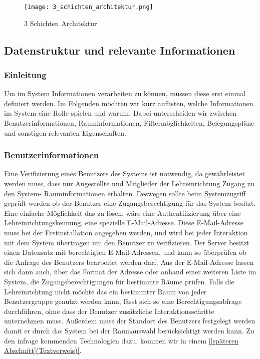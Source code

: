 \begin{figure}
	\centering
	\texttt{[image: 3\_schichten\_architektur.png]}
	\caption{3 Schichten Architektur}
\end{figure}

\subsection{Datenstruktur und relevante Informationen}
\label{sec:Datenstruktur_und_relevante_Informationen}

\subsubsection{Einleitung}
\label{sec:Datenstruktur_und_relevante_Informationen_Einleitung}

Um im System Informationen verarbeiten zu können, müssen diese erst einmal
definiert werden. Im Folgenden möchten wir kurz auflisten, welche Informationen
im System eine Rolle spielen und warum. Dabei unterscheiden wir zwischen
Benutzerinformationen, Rauminformationen, Filtermöglichkeiten, Belegungspläne
und sonstigen relevanten Eigenschaften.

\subsubsection{Benutzerinformationen}
\label{sec:Benutzerinformationen}

Eine Verifizierung eines Benutzers des Systems ist notwendig, da gewährleistet
werden muss, dass nur Angestellte und Mitglieder der Lehreinrichtung Zugang zu
den System- \bzw Rauminformationen erhalten. Deswegen sollte beim Systemzugriff
geprüft werden ob der Benutzer eine Zugangsberechtigung für das System besitzt.
Eine einfache Möglichkeit das zu lösen, wäre eine Authentifizierung über eine
Lehreinrichtungskennung, \zB eine spezielle E-Mail-Adresse.
Diese E-Mail-Adresse muss bei der Erstinstallation angegeben werden, und wird
bei jeder Interaktion mit dem System übertragen um den Benutzer zu
verifizieren. Der Server besitzt einen Datensatz mit berechtigten
E-Mail-Adressen, und kann so überprüfen ob die Anfrage des Benutzers bearbeitet
werden darf. Aus der E-Mail-Adresse lassen sich dann auch, \zB über das Format
der Adresse oder anhand einer weiteren Liste im System, die
Zugangsberechtigungen für bestimmte Räume prüfen. Falls die Lehreinrichtung
nicht möchte das ein bestimmter Raum von jeder Benutzergruppe genutzt werden
kann, lässt sich so eine Berechtigungsabfrage durchführen, ohne dass der
Benutzer zusätzliche Interaktionsschritte unternehmen muss. Außerdem muss der
Standort des Benutzers festgelegt werden damit er durch das System bei der
Raumauswahl berücksichtigt werden kann. Zu den infrage kommenden Technologien
dazu, kommen wir in einem \ref{[späteren Abschnitt](Textverweis)}.

